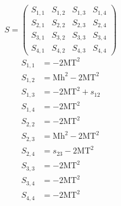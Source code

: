 \documentclass[a4paper]{article}
\begin{document}
\begin{equation}
S=\left(\begin{array}{cccc}
   S_{1,1}&
   S_{1,2}&
   S_{1,3}&
   S_{1,4}\\
   S_{2,1}&
   S_{2,2}&
   S_{2,3}&
   S_{2,4}\\
   S_{3,1}&
   S_{3,2}&
   S_{3,3}&
   S_{3,4}\\
   S_{4,1}&
   S_{4,2}&
   S_{4,3}&
   S_{4,4}\end{array}\right)
\end{equation}
\begin{subequations}
\begin{align}
   S_{1,1}&=-2\text{MT}^2\\
   S_{1,2}&=\text{Mh}^2-2\text{MT}^2\\
   S_{1,3}&=-2\text{MT}^2+s_{12}\\
   S_{1,4}&=-2\text{MT}^2\\
   S_{2,2}&=-2\text{MT}^2\\
   S_{2,3}&=\text{Mh}^2-2\text{MT}^2\\
   S_{2,4}&=s_{23}-2\text{MT}^2\\
   S_{3,3}&=-2\text{MT}^2\\
   S_{3,4}&=-2\text{MT}^2\\
   S_{4,4}&=-2\text{MT}^2
\end{align}
\end{subequations}
\end{document}
